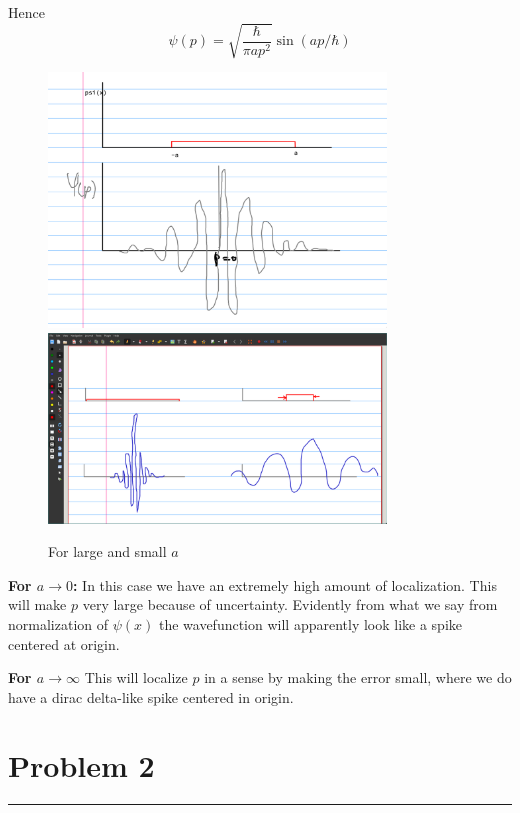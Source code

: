 \documentclass[letter, 10pts]{article}
\newcommand{\hb}{\hbar}
\begin{document}
Hence
\[
\psi(p) = \sqrt{ \frac{\hb }{\pi a p^2}}  \sin (a p / \hb)
\] 
\begin{figure}[H]
	\centering
	\includegraphics[width=0.8\textwidth]{./ss/1/1.png}
	\includegraphics[width=0.8\textwidth]{./ss/1/2.png}
	\caption{For large and small $a$}
	\label{fig:-ss-1-1-p}
\end{figure}
\textbf{For $a \to  0$:} In this case we have an extremely high amount of localization. This will make $p$ very large because of uncertainty. Evidently from what we say from normalization of $\psi(x)$ the wavefunction will apparently look like a spike centered at origin.


\textbf{For $a \to \infty$} This will localize $p$ in a sense by making the error small, where we do have a dirac delta-like spike centered in origin. 





\newpage
\section*{Problem 2} 
\hrule 
\end{document}
